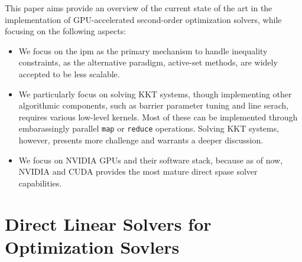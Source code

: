 \documentclass{article}
\begin{document}
This paper aims provide an overview of the current state of the art in the implementation of GPU-accelerated second-order optimization solvers, while focusing on the following aspects:
\begin{itemize}[leftmargin=*,itemsep=0pt,parsep=0pt,partopsep=0pt]
\item We focus on the \gls*{ipm} as the primary mechanism to handle inequality constraints, as the alternative paradigm, active-set methods, are widely accepted to be less scalable.
\item We particularly focus on solving KKT systems, though implementing other algorithmic components, such as barrier parameter tuning and line serach, requires various low-level kernels. Most of these can be implemented through embarassingly parallel \texttt{map} or \texttt{reduce} operations. Solving KKT systems, however, presents more challenge and warrants a deeper discussion.
\item We focus on NVIDIA GPUs and their software stack, because as of now, NVIDIA and CUDA provides the most mature direct spase solver capabilities.
\end{itemize}



\section{Direct Linear Solvers for Optimization Sovlers}\label{eqn:linear}
\end{document}
